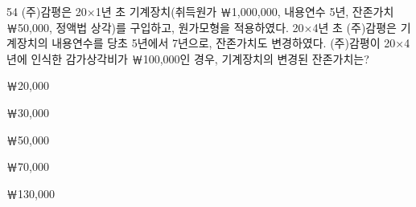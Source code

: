 \begin{question}{54}
(주)감평은 20×1년 초 기계장치(취득원가 ￦1,000,000, 내용연수 5년, 잔존가치 ￦50,000, 정액법 상각)를 구입하고, 원가모형을 적용하였다. 20×4년 초 (주)감평은 기계장치의 내용연수를 당초 5년에서 7년으로, 잔존가치도 변경하였다. (주)감평이 20×4년에 인식한 감가상각비가 ￦100,000인 경우, 기계장치의 변경된 잔존가치는?
\begin{choices}
  \item ￦20,000
  \item ￦30,000
  \item ￦50,000
  \item ￦70,000
  \item ￦130,000
\end{choices}
\end{question}
